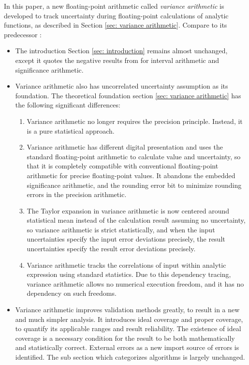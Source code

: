 \documentclass[twoside]{article}
\numberwithin{equation}{section}
\begin{document}
In this paper, a new floating-point arithmetic called \emph{variance arithmetic} is developed to track uncertainty during floating-point calculations of analytic functions, as described in Section \ref{sec: variance arithmetic}. 
Compare to its predecessor \cite{Prev_Precision_Arithmetic}:
 \begin{itemize}
\item The introduction Section \ref{sec: introduction} remains almost unchanged, except it quotes the negative results from \cite{Prev_Precision_Arithmetic} for interval arithmetic and significance arithmetic.

\item Variance arithmetic also has uncorrelated uncertainty assumption as its foundation.
The theoretical foundation section \ref{sec: variance arithmetic} has the following significant differences:

\begin{enumerate}
\item Variance arithmetic no longer requires the precision principle.  
Instead, it is a pure statistical approach. 

\item Variance arithmetic has different digital presentation and uses the standard floating-point arithmetic to calculate value and uncertainty, so that it is completely compatible with conventional floating-point arithmetic for precise floating-point values.
It abandons the embedded significance arithmetic, and the rounding error bit to minimize rounding errors in the precision arithmetic.

\item The Taylor expansion in variance arithmetic is now centered around statistical mean instead of the calculation result assuming no uncertainty, so variance arithmetic is strict statistically, and when the input uncertainties specify the input error deviations precisely, the result uncertainties specify the result error deviations precisely.

\item Variance arithmetic tracks the correlations of input within analytic expression using standard statistics.
Due to this dependency tracing, variance arithmetic allows no numerical execution freedom, and it has no dependency on such freedoms.

\end{enumerate}

\item Variance arithmetic improves validation methods greatly, to result in a new and much simpler analysis. 
It introduces ideal coverage and proper coverage, to quantify its applicable ranges and result reliability.
The existence of ideal coverage is a necessary condition for the result to be both mathematically and statistically correct.
External errors as a new import source of errors is identified.
The sub section which categorizes algorithms is largely unchanged.


\end{itemize}
\end{document}
